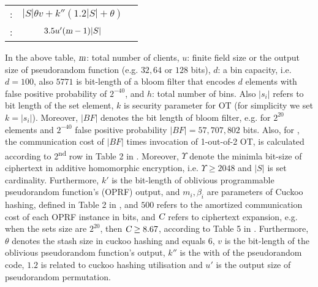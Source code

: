\begin{table*}[!htbp]
\begin{footnotesize}
\begin{center}
\begin{tabular}{|c|c|c}
      \cellcolor{white!20}\scriptsize  \cite{DBLP:conf/uss/Pinkas0SZ15}:      &\cellcolor{white!20}\scriptsize $|S|\theta v+k''(1.2|S|+\theta)$&\\ 
      
      
            \cellcolor{cyan!20}\scriptsize  \cite{kamarascaling}:      &\cellcolor{cyan!20}\scriptsize $3.5 u' (\textsl{m}-1)  |S|$&\\ 


       \hline




\end{tabular}
\end{center}
\end{footnotesize}
\end{table*}




In the above table, $\textsl{m}$: total number of clients, $u$: finite field size or the output size of pseudorandom function (e.g. $32, 64$ or $128$ bits), $d$: a bin capacity, i.e. $d=100$, also $5771$ is bit-length of a bloom filter that encodes $d$ elements with false positive probability of $2^{\scriptscriptstyle -40}$, and $h$: total number of bins. Also $|s_i|$ refers to bit length of the set element, $k$ is security parameter for OT (for simplicity we set $k=|s_i|$). Moreover, $|BF|$ denotes the bit length of bloom filter, e.g. for $2^{\scriptscriptstyle 20}$ elements and $2^{\scriptscriptstyle -40}$ false positive probability $|BF|=57,707,802$ bits. Also, for \cite{DBLP:conf/scn/InbarOP18}, the communication cost of $|BF|$ times invocation of 1-out-of-2 OT, is calculated according to 2\textsuperscript{nd} row in Table 2 in \cite{DBLP:conf/ccs/AsharovL0Z13}. Moreover, $\Upsilon$ denote the minimla bit-size of ciphertext in additive homomorphic encryption, i.e. $\Upsilon\geq 2048$ and $|S|$ is set cardinality. Furthermore,   $k'$ is the bit-length of oblivious programmable pseudorandom function's (OPRF) output, and $m_{\scriptscriptstyle i}, \beta_{\scriptscriptstyle i}$ are parameters of Cuckoo hashing, defined in Table 2 in \cite{DBLP:conf/ccs/KolesnikovMPRT17}, and $500$ refers to the amortized communication cost of each OPRF instance in bits, and $\textsl{C}$ refers to ciphertext expansion, e.g.  when the sets size are $2^{\scriptscriptstyle 20}$, then $\textsl{C}\geq8.67$, according to Table 5 in \cite{DBLP:conf/ccs/ChenLR17}. Furthermore, $\theta$ denotes the stash size in cuckoo hashing and equals $6$, $v$ is the bit-length of the oblivious pseudorandom function's output, $k''$ is the with of the pseudorandom code, $1.2$ is related to cuckoo hashing utilisation and $u'$ is the output size of pseudorandom permutation.
